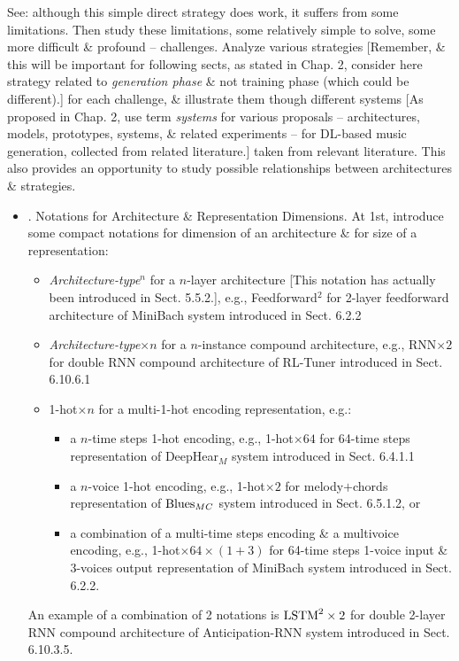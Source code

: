 \documentclass{article}
\begin{document}
\begin{itemize}
	See: although this simple direct strategy does work, it suffers from some limitations. Then study these limitations, some relatively simple to solve, some more difficult \& profound -- challenges. Analyze various strategies [Remember, \& this will be important for following sects, as stated in Chap. 2, consider here strategy related to {\it generation phase} \& not training phase (which could be different).] for each challenge, \& illustrate them though different systems [As proposed in Chap. 2, use term {\it systems} for various proposals -- architectures, models, prototypes, systems, \& related experiments -- for DL-based music generation, collected from related literature.] taken from relevant literature. This also provides an opportunity to study possible relationships between architectures \& strategies.
	\begin{itemize}
		\item {. Notations for Architecture \& Representation Dimensions.} At 1st, introduce some compact notations for dimension of an architecture \& for size of a representation:
		\begin{itemize}
			\item {\it Architecture-type}${}^n$ for a $n$-layer architecture [This notation has actually been introduced in Sect. 5.5.2.], e.g., Feedforward${}^2$ for 2-layer feedforward architecture of MiniBach system introduced in Sect. 6.2.2
			\item {\it Architecture-type}$\times n$ for a $n$-instance compound architecture, e.g., RNN$\times2$ for double RNN compound architecture of RL-Tuner introduced in Sect. 6.10.6.1
			\item 1-hot$\times n$ for a multi-1-hot encoding representation, e.g.:
			\begin{itemize}
				\item a $n$-time steps 1-hot encoding, e.g., 1-hot$\times64$ for 64-time steps representation of DeepHear${}_M$ system introduced in Sect. 6.4.1.1
				\item a $n$-voice 1-hot encoding, e.g., 1-hot$\times2$ for melody$+$chords representation of ${\rm Blues}_{MC}$ system introduced in Sect. 6.5.1.2, or
				\item a combination of a multi-time steps encoding \& a multivoice encoding, e.g., 1-hot$\times64\times(1 + 3)$ for 64-time steps 1-voice input \& 3-voices output representation of MiniBach system introduced in Sect. 6.2.2.
			\end{itemize}
		\end{itemize}
		An example of a combination  of 2 notations is ${\rm LSTM}^2\times2$ for double 2-layer RNN compound architecture of Anticipation-RNN system introduced in Sect. 6.10.3.5.

\end{itemize}
\end{itemize}
\end{document}
